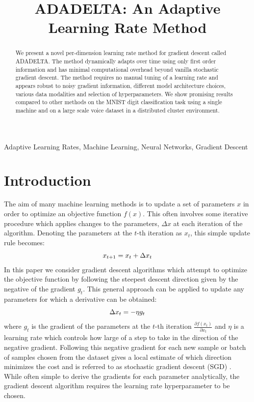 \documentclass{article}
\title{ADADELTA: An Adaptive Learning Rate Method}
\def\BE{\vspace{-2.0mm}\begin{equation}}
\def\EE{\vspace{-1.4mm}\end{equation}}
\begin{document}
%
\maketitle
%
\begin{abstract}
  We present a novel per-dimension learning rate method for gradient descent called ADADELTA.
  The method dynamically adapts over time using only first order
  information and has minimal computational overhead beyond vanilla stochastic gradient
  descent. The method requires no manual tuning of a learning rate and appears robust to noisy
  gradient information, different model architecture choices, various data modalities and selection of hyperparameters.
  We show promising results compared to other methods on the MNIST digit classification task
  using a single machine and  on a large scale voice dataset in a distributed cluster environment.
\end{abstract}

\begin{keywords}
  Adaptive Learning Rates, Machine Learning, Neural Networks, Gradient Descent
\end{keywords}

\section{Introduction} \label{sec:intro}

The aim of many machine learning methods is to update a set of parameters $x$ in order to
optimize an objective function $f(x)$. This often involves some iterative procedure which applies
changes to the parameters, $\Delta x$ at each iteration of the algorithm. Denoting the parameters at
the $t$-th iteration as $x_t$, this simple update rule becomes:
\BE
x_{t+1} = x_t + \Delta x_t
\label{eqn:update}
\EE
In this paper we consider gradient descent algorithms which attempt to optimize the objective
function by following the steepest descent direction given by the negative of the gradient
$g_t$. This general approach can be applied to update any parameters for which a derivative can be
obtained:
\BE
\Delta x_t = - \eta g_t
\label{eqn:change}
\EE
where $g_t$ is the gradient of the parameters at the $t$-th iteration
$\frac{\partial f(x_t)}{\partial x_t}$
and $\eta$ is a learning rate which controls how large of a step to take in
the direction of the negative gradient. Following this negative gradient for each new sample or
batch of samples chosen from the dataset gives a local estimate of which direction minimizes the
cost and is referred to as stochastic gradient descent (SGD) \cite{robbins51}. While often simple to
derive the gradients for each parameter analytically, the gradient descent algorithm requires the
learning rate hyperparameter to be chosen.
\end{document}
